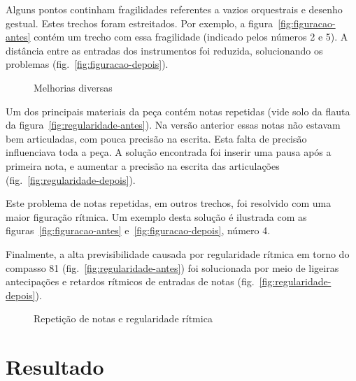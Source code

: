 \documentclass[10pt]{article}
\begin{document}
Alguns pontos continham fragilidades referentes a vazios orquestrais e
desenho gestual. Estes trechos foram estreitados. Por exemplo, a
figura~\ref{fig:figuracao-antes} contém um trecho com essa fragilidade
(indicado pelos números 2 e 5). A distância entre as entradas dos
instrumentos foi reduzida, solucionando os problemas
(fig.~\ref{fig:figuracao-depois}).

\begin{figure*}
  \centering

  \caption{Melhorias diversas}
  \label{fig:figuracao}
\end{figure*}

Um dos principais materiais da peça contém notas repetidas (vide solo
da flauta da figura~\ref{fig:regularidade-antes}). Na versão anterior
essas notas não estavam bem articuladas, com pouca precisão na
escrita. Esta falta de precisão influenciava toda a peça. A solução
encontrada foi inserir uma pausa após a primeira nota, e aumentar a
precisão na escrita das articulações
(fig.~\ref{fig:regularidade-depois}).

Este problema de notas repetidas, em outros trechos, foi resolvido com
uma maior figuração rítmica. Um exemplo desta solução é ilustrada com
as figuras~\ref{fig:figuracao-antes} e~\ref{fig:figuracao-depois},
número 4.

Finalmente, a alta previsibilidade causada por regularidade rítmica em
torno do compasso 81 (fig.~\ref{fig:regularidade-antes}) foi
solucionada por meio de ligeiras antecipações e retardos rítmicos de
entradas de notas (fig.~\ref{fig:regularidade-depois}).

\begin{figure*}
  \centering

  \caption{Repetição de notas e regularidade rítmica}
  \label{fig:regularidade}
\end{figure*}

\section{Resultado}
\label{sec:resultado}
\end{document}
